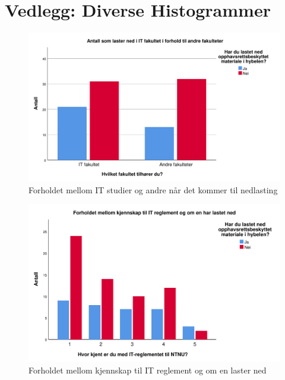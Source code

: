 \chapter{Vedlegg: Diverse Histogrammer}
\label{vedlegg:histogrammer}

\begin{figure}[H]
    \centering
    \includegraphics[scale=0.45]{case_1/bilder/IT_lasterned.pdf}
    \caption[IT-lasterned]{Forholdet mellom IT studier og andre når det kommer til nedlasting}
    \label{fig:IT-lasterned}
\end{figure}

\begin{figure}[H]
    \centering
    \includegraphics[scale=0.45]{case_1/bilder/reglement_lasterned.pdf}
    \caption[reglement-lasterned]{Forholdet mellom kjennskap til IT reglement og om en laster ned}
    \label{fig:reglement-lasterned}
\end{figure}

